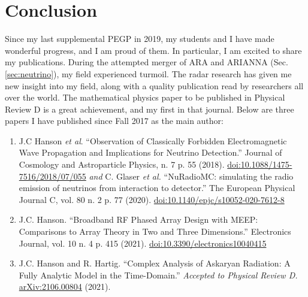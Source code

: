 \documentclass[../../main.tex]{subfiles}
\begin{document}
%

\begin{flushleft}

\end{flushleft}

\section{Conclusion}

Since my last supplemental PEGP in 2019, my students and I have made wonderful progress, and I am proud of them.  In particular, I am excited to share my publications.  During the attempted merger of ARA and ARIANNA (Sec. \ref{sec:neutrino}), my field experienced turmoil.  The radar research has given me new insight into my field, along with a quality publication read by researchers all over the world.  The mathematical physics paper to be published in Physical Review D is a great achievement, and my first in that journal.  Below are three papers I have published since Fall 2017 as the main author:
\begin{enumerate}
\item J.C Hanson \textit{et al}.  ``Observation of Classically Forbidden Electromagnetic Wave Propagation and Implications for Neutrino Detection.''  Journal of Cosmology and Astroparticle Physics, n. 7 p. 55 (2018). \url{doi:10.1088/1475-7516/2018/07/055} \textit{and} C. Glaser \textit{et al.} ``NuRadioMC: simulating the radio emission of neutrinos from interaction to detector.'' The European Physical Journal C, vol. 80 n. 2 p. 77 (2020).  \url{doi:10.1140/epjc/s10052-020-7612-8}
\item J.C. Hanson.  ``Broadband RF Phased Array Design with MEEP: Comparisons to Array Theory in Two and Three Dimensions.''  Electronics Journal, vol. 10 n. 4 p. 415 (2021).  \url{doi:10.3390/electronics10040415}
\item J.C. Hanson and R. Hartig. ``Complex Analysis of Askaryan Radiation: A Fully Analytic Model in the Time-Domain.'' \textit{Accepted to Physical Review D.} \url{arXiv:2106.00804} (2021).
\end{enumerate}
\end{document}
